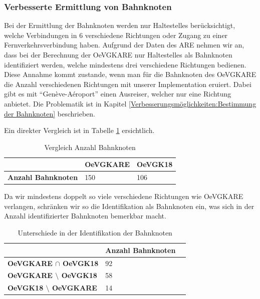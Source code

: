 \subsubsection{Verbesserte Ermittlung von Bahnknoten}
Bei der Ermittlung der Bahnknoten werden nur \glspl{Haltestelle} berücksichtigt, welche Verbindungen in 6 verschiedene Richtungen oder Zugang zu einer Fernverkehrsverbindung haben.
Aufgrund der Daten des \acl{ARE} nehmen wir an, dass bei der Berechnung der \gls{OeVGKARE} nur \glspl{Haltestelle} als Bahnknoten identifiziert werden, welche mindestens drei verschiedene Richtungen bedienen.
Diese Annahme kommt zustande, wenn man für die Bahnknoten des \gls{OeVGKARE} die Anzahl verschiedenen Richtungen mit unserer Implementation eruiert.
Dabei gibt es mit "`Genève-Aéroport"' einen Ausreiser, welcher nur eine Richtung anbietet.
Die Problematik ist in Kapitel \ref{Verbesserungsmöglichkeiten:Bestimmung der Bahnknoten} beschrieben.

Ein direkter Vergleich ist in Tabelle \ref{table:Vergleich Anzahl Bahnknoten} ersichtlich.

\begin{table}[H]
    \centering
    \begin{tabular}[c]{l l l}
        \toprule
        \textbf{}
                                & \textbf{\gls{OeVGKARE}}
                                & \textbf{\gls{OeVGK18}}\\
        \midrule
        \textbf{Anzahl Bahnknoten}
                                & 150
                                & 106\\
        \bottomrule
    \end{tabular}
    \caption{Vergleich Anzahl Bahnknoten}
    \label{table:Vergleich Anzahl Bahnknoten}
\end{table}

Da wir mindestens doppelt so viele verschiedene Richtungen wie \gls{OeVGKARE} verlangen, schränken wir so die Identifikation als Bahnknoten ein, was sich in der Anzahl identifizierter Bahnknoten bemerkbar macht.

\begin{table}[H]
    \centering
    \begin{tabular}[c]{l l l}
        \toprule
        \textbf{}
                                            & \textbf{Anzahl Bahnknoten}\\
        \midrule
        \textbf{\gls{OeVGKARE} $\cap$ \gls{OeVGK18}}       & 92\\
        \textbf{\gls{OeVGKARE} $\setminus$ \gls{OeVGK18}}  & 58\\
        \textbf{\gls{OeVGK18} $\setminus$ \gls{OeVGKARE}}  & 14\\
        \bottomrule
    \end{tabular}
    \caption{Unterschiede in der Identifikation der Bahnknoten}
    \label{table:Unterschiede in der Identifikation der Bahnknoten}
\end{table}

